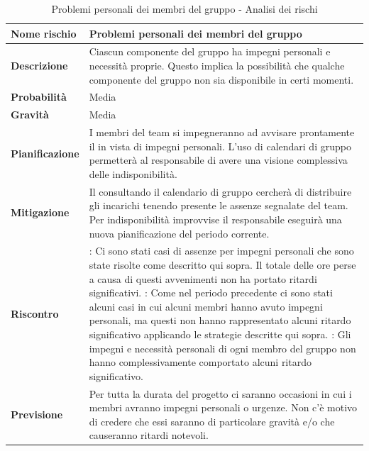 \documentclass[12pt,a4paper]{article}
\begin{document}
\begin{table}[H]
	\begin{center}
		\begin{tabular}{p{} p{}}
			\toprule
			\textbf{Nome rischio} & \textbf{Problemi personali dei membri del gruppo} \\
			\midrule
			\midrule
			\textbf{Descrizione} & Ciascun componente del gruppo ha impegni personali e necessità proprie. Questo implica la possibilità che qualche componente del gruppo non sia disponibile in certi momenti. \\
			\midrule
			\textbf{Probabilità} & Media \\
			\midrule
			\textbf{Gravità} & Media \\
			\midrule
			\textbf{Pianificazione} & I membri del team si impegneranno ad avvisare prontamente il \PM{} in vista di impegni personali. L’uso di calendari di gruppo permetterà al responsabile di avere una visione complessiva delle indisponibilità.  \\
			\midrule
			\textbf{Mitigazione} & Il \PM{} consultando il calendario di gruppo cercherà di distribuire gli incarichi tenendo presente le assenze segnalate del team. Per indisponibilità improvvise il responsabile eseguirà una nuova pianificazione del periodo corrente. \\
			\midrule
			\textbf{Riscontro} & 
                \textbf{\FA{}}: Ci sono stati casi di assenze per impegni personali che sono state 
                    risolte come descritto qui sopra. Il totale delle ore perse a causa di questi avvenimenti 
                    non ha portato ritardi significativi. \newline
                \textbf{\FAD{}}: Come nel periodo precedente ci sono stati alcuni casi in cui alcuni membri
                    hanno avuto impegni personali, ma questi non hanno rappresentato alcuni ritardo significativo
                    applicando le strategie descritte qui sopra. \newline
                \textbf{\FPA{}}: Gli impegni e necessità personali di ogni membro del gruppo non hanno
                    complessivamente comportato alcuni ritardo significativo. \\
			\midrule
			\textbf{Previsione} & Per tutta la durata del progetto ci saranno occasioni in cui i membri avranno impegni personali o urgenze. Non c'è motivo di credere che essi saranno di particolare gravità e/o che causeranno ritardi notevoli. \\
			\bottomrule
		\end{tabular}
		\caption{Problemi personali dei membri del gruppo - Analisi dei rischi}
	\end{center}
\end{table}
\end{document}
